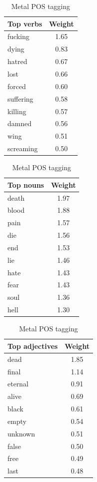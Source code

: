 \documentclass[a4paper,11pt]{article}
\begin{document}
\begin{table}[h!]
\centering
\begin{tabular}{|l|c|}
\hline
Top verbs & Weight \\
\hline
fucking & 1.65 \\
dying & 0.83 \\
hatred & 0.67 \\
lost & 0.66 \\
forced & 0.60 \\
suffering & 0.58 \\
killing & 0.57 \\
damned & 0.56 \\
wing & 0.51 \\
screaming & 0.50 \\
\hline
\end{tabular}
\quad
\begin{tabular}{|l|c|}
\hline
Top nouns & Weight \\
\hline
death & 1.97 \\
blood & 1.88 \\
pain & 1.57 \\
die & 1.56 \\
end & 1.53 \\
lie & 1.46 \\
hate & 1.43 \\
fear & 1.43 \\
soul & 1.36 \\
hell & 1.30 \\
\hline
\end{tabular}
\quad
\begin{tabular}{|l|c|}
\hline
Top adjectives & Weight \\
\hline
dead & 1.85 \\
final & 1.14 \\
eternal & 0.91 \\
alive & 0.69 \\
black & 0.61 \\
empty & 0.54 \\
unknown & 0.51 \\
false & 0.50 \\
free & 0.49 \\
last & 0.48 \\
\hline
\end{tabular}
\caption{Metal POS tagging}
\label{label-metal-pos}
\end{table}
\end{document}
